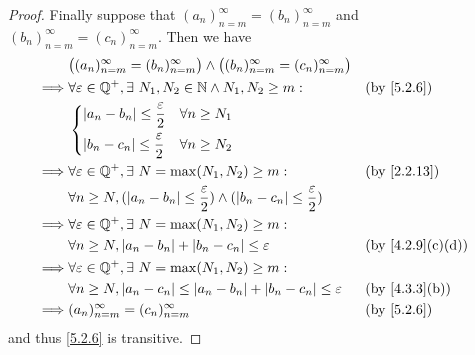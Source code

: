\begin{proof}
  Finally suppose that \((a_n)_{n = m}^\infty = (b_n)_{n = m}^\infty\) and \((b_n)_{n = m}^\infty = (c_n)_{n = m}^\infty\).
  Then we have
  \begin{align*}
             & \big((a_n)_{n = m}^\infty = (b_n)_{n = m}^\infty\big) \land \big((b_n)_{n = m}^\infty = (c_n)_{n = m}^\infty\big)                                       \\
    \implies & \forall \varepsilon \in \Q^+, \exists\ N_1, N_2 \in \N \land N_1, N_2 \geq m:                                       &  & \text{(by \cref{5.2.6})}       \\
             & \begin{dcases}
                 \abs{a_n - b_n} \leq \dfrac{\varepsilon}{2} & \forall n \geq N_1 \\
                 \abs{b_n - c_n} \leq \dfrac{\varepsilon}{2} & \forall n \geq N_2 \\
               \end{dcases}                                                                                        \\
    \implies & \forall \varepsilon \in \Q^+, \exists\ N = \max(N_1, N_2) \geq m:                                                   &  & \text{(by \cref{2.2.13})}      \\
             & \forall n \geq N, (\abs{a_n - b_n} \leq \dfrac{\varepsilon}{2}) \land (\abs{b_n - c_n} \leq \dfrac{\varepsilon}{2})                                     \\
    \implies & \forall \varepsilon \in \Q^+, \exists\ N = \max(N_1, N_2) \geq m:                                                                                       \\
             & \forall n \geq N, \abs{a_n - b_n} + \abs{b_n - c_n} \leq \varepsilon                                                &  & \text{(by \cref{4.2.9}(c)(d))} \\
    \implies & \forall \varepsilon \in \Q^+, \exists\ N = \max(N_1, N_2) \geq m:                                                                                       \\
             & \forall n \geq N, \abs{a_n - c_n} \leq \abs{a_n - b_n} + \abs{b_n - c_n} \leq \varepsilon                           &  & \text{(by \cref{4.3.3}(b))}    \\
    \implies & (a_n)_{n = m}^\infty = (c_n)_{n = m}^\infty                                                                         &  & \text{(by \cref{5.2.6})}
  \end{align*}
  and thus \cref{5.2.6} is transitive.
\end{proof}

